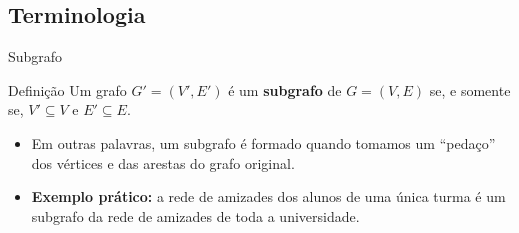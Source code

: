 \documentclass[xcolor=table]{beamer}
\begin{document}
\subsection{Terminologia}
\begin{frame}{Subgrafo}
  \begin{block}{Definição}
    Um grafo $G' = (V',E')$ é um \textbf{subgrafo} de $G = (V,E)$ se, e somente se, $V' \subseteq V$ e $E' \subseteq E$.
  \end{block}
  \begin{itemize}
    \item Em outras palavras, um subgrafo é formado quando tomamos um ``pedaço'' dos vértices e das arestas do grafo original.
    \item \textbf{Exemplo prático:} a rede de amizades dos alunos de uma única turma é um subgrafo da rede de amizades de toda a universidade.
  \end{itemize}
  \centering
\end{frame}
\end{document}
